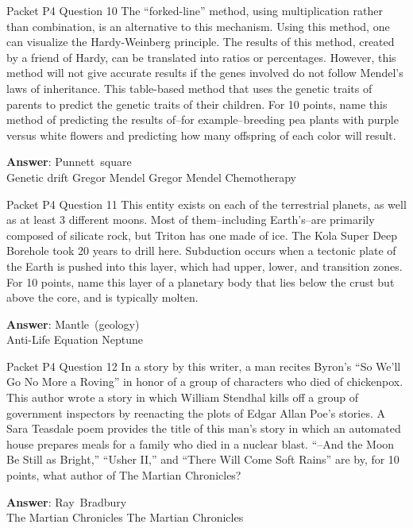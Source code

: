 \begin{frame}{Packet P4 Question 10}
The ``forked-line'' method, using multiplication rather than combination, is an alternative to this mechanism. Using this method, one can visualize the Hardy-Weinberg principle. The results of this method,   created by a friend of Hardy, can be translated into ratios or percentages. However, this method will not give accurate results if the genes involved do not follow Mendel's laws of inheritance. This table-based method that uses the genetic traits of parents to predict the genetic traits of their children. For 10 points, name this method of predicting the results of--for example--breeding pea plants   with purple versus white flowers and predicting how many offspring of each color will result.    

\textbf{Answer}: Punnett\ square\\
 Genetic drift
 Gregor Mendel
 Gregor Mendel
 Chemotherapy
\end{frame}

\begin{frame}{Packet P4 Question 11}
This entity exists on   each of the terrestrial planets, as well as at least 3 different moons. Most of them--including Earth's--are primarily composed of silicate rock, but Triton has   one made of ice. The Kola Super Deep Borehole took 20 years to drill here. Subduction occurs when a tectonic plate of the Earth is pushed into this layer, which   had upper, lower, and transition zones. For 10 points, name this layer of a planetary   body that lies below the crust but     above the core, and is typically molten.

\textbf{Answer}: Mantle\ (geology)\\
 Anti-Life Equation
 Neptune
\end{frame}

\begin{frame}{Packet P4 Question 12}
In a story by this writer, a man recites Byron’s “So We'll Go No More a Roving” in honor of a group of characters who died of chickenpox. This author wrote a story in which William Stendhal kills off a group of government inspectors by reenacting the plots of Edgar Allan Poe’s stories. A Sara Teasdale poem provides the title of this man’s story in which an automated house prepares     meals for a family who died in a nuclear blast. “--And the Moon Be Still as Bright,” “Usher II,” and   “There Will Come Soft Rains” are by,   for 10 points, what author of The Martian Chronicles?

\textbf{Answer}: Ray\ Bradbury\\
 The Martian Chronicles
 The Martian Chronicles
\end{frame}

